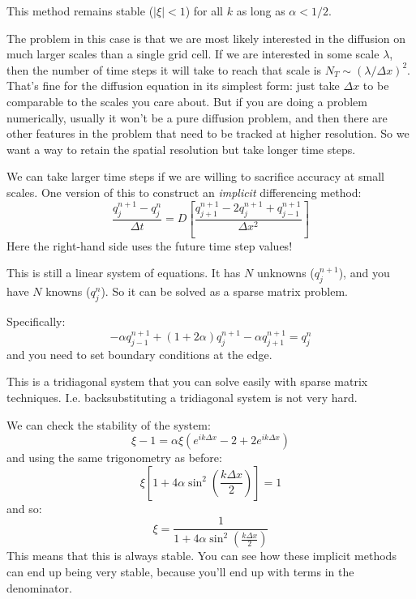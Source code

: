 \begin{answer}
This method remains stable ($|\xi|<1$) for all $k$ as long as $\alpha
< 1/2$.
\end{answer}

The problem in this case is that we are most likely interested in the
diffusion on much larger scales than a single grid cell. If we are
interested in some scale $\lambda$, then the number of time steps it
will take to reach that scale is $N_T \sim (\lambda / \Delta
x)^2$. That's fine for the diffusion equation in its simplest form:
just take $\Delta x$ to be comparable to the scales you care
about. But if you are doing a problem numerically, usually it won't be
a pure diffusion problem, and then there are other features in the
problem that need to be tracked at higher resolution. So we want a way
to retain the spatial resolution but take longer time steps.

We can take larger time steps if we are willing to sacrifice accuracy
at small scales. One version of this to construct an {\it implicit}
differencing method:
\begin{equation}
\frac{q_j^{n+1} - q_j^{n}}{\Delta t} = D \left[\frac{q_{j+1}^{n+1} - 2
q_j^{n+1} + q_{j-1}^{n+1}}{\Delta x^2}\right]
\end{equation}
Here the right-hand side uses the future time step values!


\begin{answer}
This is still a linear system of equations. It has $N$ unknowns
($q_j^{n+1}$), and you have $N$ knowns ($q_j^{n}$). So it can be solved
as a sparse matrix problem. 

Specifically:
\begin{equation}
-\alpha q_{j-1}^{n+1} + (1 + 2\alpha) q_j^{n+1} - \alpha q_{j+1}^{n+1}
 = q_j^n
\end{equation}
and you need to set boundary conditions at the edge.

This is a tridiagonal system that you can solve easily with sparse
matrix techniques. I.e. backsubstituting a tridiagonal system is not
very hard.
\end{answer}

We can check the stability of the system:
\begin{equation}
\xi - 1 = \alpha \xi \left(e^{ik\Delta x} - 2 + 2 e^{ik\Delta x}\right)
\end{equation}
and using the same trigonometry as before:
\begin{equation}
\xi \left[ 1+ 4 \alpha \sin^2\left(\frac{k\Delta x}{2}\right)\right] =
1
\end{equation}
and so:
\begin{equation}
\xi = \frac{1}{ 1+ 4 \alpha \sin^2\left(\frac{k\Delta x}{2}\right)}
\end{equation}
This means that this is always stable. You can see how these implicit
methods can end up being very stable, because you'll end up with terms
in the denominator.


